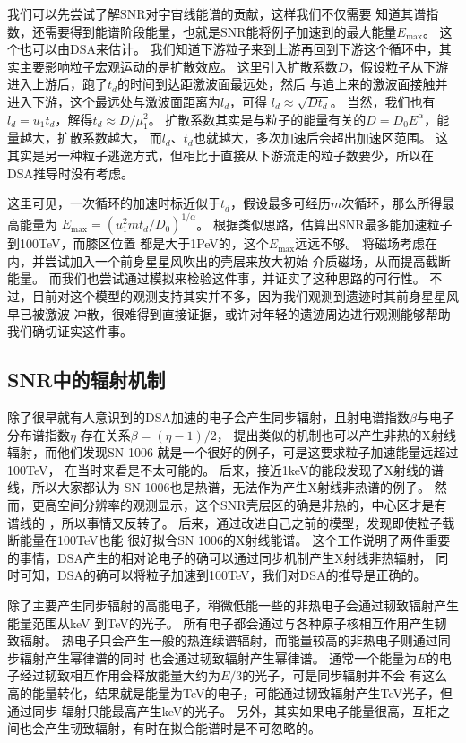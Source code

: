 我们可以先尝试了解SNR对宇宙线能谱的贡献\citep{Ptuskin2010}，这样我们不仅需要
知道其谱指数，还需要得到能谱阶段能量，也就是SNR能将例子加速到的最大能量$E_{\max}$。
这个也可以由DSA来估计。
我们知道下游粒子来到上游再回到下游这个循环中，其实主要影响粒子宏观运动的是扩散效应。
这里引入扩散系数$D$，假设粒子从下游进入上游后，跑了$t_d$的时间到达距激波面最远处，然后
与追上来的激波面接触并进入下游，这个最远处与激波面距离为$l_d$，可得
$l_{d} \approx \sqrt{D t_{d}}$。
当然，我们也有$l_{d}=u_{1} t_{d}$，解得$t_d \approx D/\mu_1^2$。
扩散系数其实是与粒子的能量有关的$D=D_{0} E^{\alpha}$，能量越大，扩散系数越大，
而$l_{d}$、$t_{d}$也就越大，多次加速后会超出加速区范围。
这其实是另一种粒子逃逸方式\citep{Li2012}，但相比于直接从下游流走的粒子数要少，所以在
DSA推导时没有考虑。

这里可见，一次循环的加速时标近似于$t_{d}$，假设最多可经历$m$次循环，那么所得最高能量为
$E_{\max }=(u_{1}^{2} m t_{d}/D_{0})^{1/\alpha}$。
根据类似思路，\citet{1983A&A...125..249L}估算出SNR最多能加速粒子到100TeV，而膝区位置
都是大于1PeV的，这个$E_{\max}$远远不够。
\citet{Zirakashvili2018}将磁场考虑在内，并尝试加入一个前身星星风吹出的壳层来放大初始
介质磁场，从而提高截断能量。
而我们也尝试通过模拟来检验这件事，并证实了这种思路的可行性\citep{Zhang2018}。
不过，目前对这个模型的观测支持其实并不多，因为我们观测到遗迹时其前身星星风早已被激波
冲散，很难得到直接证据，或许对年轻的遗迹周边进行观测能够帮助我们确切证实这件事。

\subsection{SNR中的辐射机制}

除了很早就有人意识到的DSA加速的电子会产生同步辐射，且射电谱指数$\beta$与电子分布谱指数$\eta$
存在关系$\beta=(\eta-1)/2$，
\citet{Reynolds1981}提出类似的机制也可以产生非热的X射线辐射，而他们发现SN 1006
就是一个很好的例子\citep{Becker1980}，可是这要求粒子加速能量远超过100TeV，
在当时来看是不太可能的。
后来，\citet{1982ApL....22..103G}接近1keV的能段发现了X射线的谱线，所以大家都认为
SN 1006也是热谱，无法作为产生X射线非热谱的例子。
然而，更高空间分辨率的观测显示，这个SNR壳层区的确是非热的，中心区才是有谱线的
\citep{Koyama1995}，所以事情又反转了。
后来，\citep{Reynolds1998}通过改进自己之前的模型，发现即使粒子截断能量在100TeV也能
很好拟合SN 1006的X射线能谱。
这个工作说明了两件重要的事情，DSA产生的相对论电子的确可以通过同步机制产生X射线非热辐射，
同时可知，DSA的确可以将粒子加速到100TeV，我们对DSA的推导是正确的。

除了主要产生同步辐射的高能电子，稍微低能一些的非热电子会通过韧致辐射产生能量范围从keV
到TeV的光子。
所有电子都会通过与各种原子核相互作用产生韧致辐射。
热电子只会产生一般的热连续谱辐射，而能量较高的非热电子则通过同步辐射产生幂律谱的同时
也会通过韧致辐射产生幂律谱。
通常一个能量为$E$的电子经过韧致相互作用会释放能量大约为$E/3$的光子，可是同步辐射并不会
有这么高的能量转化，结果就是能量为TeV的电子，可能通过韧致辐射产生TeV光子，但通过同步
辐射只能最高产生keV的光子。
另外，其实如果电子能量很高，互相之间也会产生韧致辐射，有时在拟合能谱时是不可忽略的。

